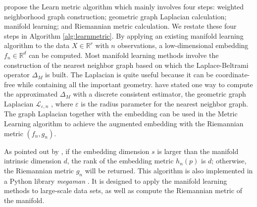 \documentclass[11pt,a4paper,]{article}
\begin{document}
\textcite{Perrault-Joncas2013-pq} propose the Learn metric algorithm which mainly involves four steps: weighted neighborhood graph construction; geometric graph Laplacian calculation; manifold learning; and Riemannian metric calculation. We restate these four steps in Algorithm \ref{alg:learnmetric}.
By applying an existing manifold learning algorithm to the data \(X\in \mathbb{R}^r\) with \(n\) observations, a low-dimensional embedding \(f_n \in \mathbb{R}^d\) can be computed. Most manifold learning methods involve the construction of the nearest
neighbor graph based on which the Laplace-Beltrami operator \(\Delta_M\) is built. The Laplacian is quite useful because it can be coordinate-free while containing all the important geometry.
\textcite{Perrault-Joncas2013-pq} have stated one way to compute the approximated \(\Delta_M\) with a discrete consistent estimator, the geometric graph Laplacian \(\mathcal{L}_{\varepsilon,n}\) \autocite{Zhou2011-za}, where \(\varepsilon\) is the radius parameter for the nearest neighbor graph.
The graph Laplacian together with the embedding can be used in the Metric Learning algorithm to achieve the augmented embedding with the Riemannian metric \((f_n, g_n)\).

As pointed out by \textcite{Perrault-Joncas2013-pq}, if the embedding dimension \(s\) is larger than the manifold intrinsic dimension \(d\), the rank of the embedding metric \(h_n(p)\) is \(d\); otherwise, the Riemannian metric \(g_n\) will be returned. This algorithm is also implemented in a Python library \emph{megaman} \autocite{McQueen2016-xz}. It is designed to apply the manifold learning methods to large-scale data sets, as well as compute the Riemannian metric of the manifold.
\end{document}
